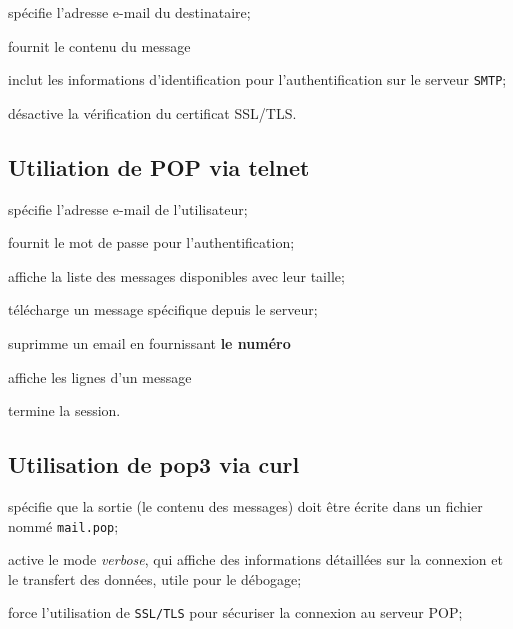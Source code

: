 \documentclass[a4paper]{report}
\begin{document}
    spécifie l'adresse e-mail du destinataire;  

    fournit le contenu du message  

     inclut les informations
    d'identification 
    pour l'authentification sur le serveur \texttt{SMTP};  

    désactive la vérification du certificat SSL/TLS.

\subsection{Utiliation de POP via telnet}
 spécifie l'adresse e-mail de l'utilisateur;  

     fournit le mot de passe pour 
    l'authentification;  

     affiche la liste des messages 
    disponibles avec leur taille;  

     télécharge un message spécifique 
    depuis le serveur;  

     suprimme un email en fournissant 
    \textbf{le numéro}                                                      

     affiche les lignes d'un message

     termine la session.


\subsection{Utilisation de pop3 via curl}
    spécifie que la sortie (le contenu des messages) doit être écrite 
    dans un fichier nommé \texttt{mail.pop};  

\noindent{} 
    active le mode \textit{verbose}, qui affiche des informations détaillées 
    sur la connexion et le transfert des données, utile pour le débogage;  

\noindent{} 
    force l'utilisation de \texttt{SSL/TLS} pour sécuriser la connexion au 
    serveur POP;  
\end{document}
